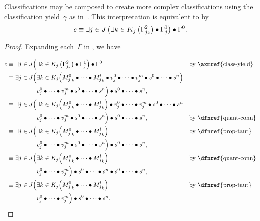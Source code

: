 \begin{theorem}
  Classifications may be composed to create more complex classifications
    using the classification yield~$\gamma$ as in~.
  This interpretation is equivalent to  by
  \begin{equation}
    c \equiv \Exists{j\in J}{
               \Exists{k\in K_j}{\Gamma^2_{j_k}}
               \bullet \Gamma^1_j
             }
             \bullet \Gamma^0.
  \end{equation}
\end{theorem}

\def\eejJ{\equiv \exists{j\in J}\Big(}

\begin{proof}
  Expanding each~$\Gamma$ in ,
    we have

  \begin{alignat*}{3}
    c &\eejJ\Exists{k\in K_j}{\Gamma^2_{j_k}}
              \bullet \Gamma^1_j
            \Big)
            \bullet \Gamma^0
        &&\text{by \axmref{class-yield}} \\
      &\eejJ\exists{k\in K_j}\Big(
              \cpredmatseq \bullet \cpredvecseq \bullet \cpredscalarseq
            \Big) \\
      &\hphantom{\eejJ}\;\cpredvecseq \bullet \cpredscalarseq \Big)
                \bullet \cpredscalarseq, \\
      &\eejJ\exists{k\in K_j}\Big(\cpredmatseq\Big)
            \bullet \cpredvecseq \bullet \cpredscalarseq \\
      &\hphantom{\eejJ}\;\cpredvecseq \bullet \cpredscalarseq \Big)
                \bullet \cpredscalarseq,
        &&\text{by \dfnref{quant-conn}} \\
      &\eejJ\exists{k\in K_j}\Big(\cpredmatseq\Big)
        &&\text{by \dfnref{prop-taut}} \\
      &\hphantom{\eejJ}\;\cpredvecseq \bullet \cpredscalarseq \Big)
                \bullet \cpredscalarseq, \\
      &\eejJ\exists{k\in K_j}\Big(\cpredmatseq\Big)
        &&\text{by \dfnref{quant-conn}} \\
      &\hphantom{\eejJ}\;\cpredvecseq\Big) \bullet \cpredscalarseq
                \bullet \cpredscalarseq, \\
      &\eejJ\exists{k\in K_j}\Big(\cpredmatseq\Big)
        &&\text{by \dfnref{prop-taut}} \\
      &\hphantom{\eejJ}\;\cpredvecseq\Big)
                \bullet \cpredscalarseq.
        \tag*{\qedhere} \\
  \end{alignat*}
\end{proof}


